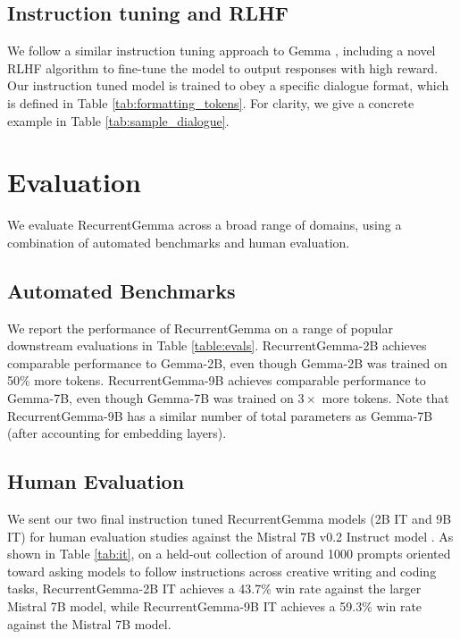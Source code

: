 \documentclass[9pt, a4paper, logo, twocolumn, copyright, nonumbering]{googledeepmind}
\begin{document}
\subsection{Instruction tuning and RLHF}


We follow a similar instruction tuning approach to Gemma \citep{gemma2024}, including a novel RLHF algorithm to fine-tune the model to output responses with high reward. Our instruction tuned model is trained to obey a specific dialogue format, which is defined in Table \ref{tab:formatting_tokens}. For clarity, we give a concrete example in Table \ref{tab:sample_dialogue}.

\section{Evaluation}

We evaluate RecurrentGemma across a broad range of domains, using a combination of automated benchmarks and human evaluation.


\subsection{Automated Benchmarks}

We report the performance of RecurrentGemma on a range of popular downstream evaluations in Table \ref{table:evals}. RecurrentGemma-2B achieves comparable performance to Gemma-2B, even though Gemma-2B was trained on 50$\%$ more tokens. RecurrentGemma-9B achieves comparable performance to Gemma-7B, even though Gemma-7B was trained on $3\times$ more tokens. Note that RecurrentGemma-9B has a similar number of total parameters as Gemma-7B (after accounting for embedding layers).

\subsection{Human Evaluation}

We sent our two final instruction tuned RecurrentGemma models (2B IT and 9B IT) for human evaluation studies against the Mistral 7B v0.2 Instruct model \citep{mistral}. As shown in Table \ref{tab:it}, on a held-out collection of around 1000 prompts oriented toward asking models to follow instructions across creative writing and coding tasks, RecurrentGemma-2B IT achieves a 43.7\% win rate against the larger Mistral 7B model, while RecurrentGemma-9B IT achieves a 59.3\% win rate against the Mistral 7B model.
\end{document}
